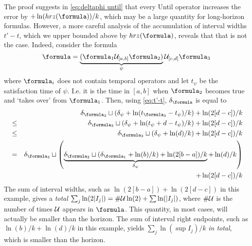 \begin{rem}
	The proof suggests in \eqref{eq:deltaphi until} that every Until operator increases the error by $+\ln(hrz(\formula))/k$, which may be a large quantity for long-horizon formulas.
	However, a more careful analysis of the accumulation of interval widths $t'-t$, which we upper bounded above by $hrz(\formula)$, reveals that that is not the case.
	Indeed, consider the formula
	\[\formula = \underbrace{(\formula_1 \until_{[a,b]} \formula_2) }_{\psi}\until_{[c,d]} \formula_3\]
	where $\formula_i$ does not contain temporal operators and let $t_\psi$ be the satisfaction time of $\psi$. 
	I.e. it is the time in $[a,b]$ when $\formula_2$ becomes true and `takes over' from $\formula_1$.
	Then, using \eqref{eq:t'-t}, $\delta_{\formula}$ is equal to
	\begin{eqnarray*}
	 && \delta_{\formula_3} \sqcup ( \delta_{\psi} + \ln(t_{\formula_3} - t_\psi)/k )+ \ln(2[d-c])/k 
	\\
	&\leq& \delta_{\formula_3} \sqcup ( \delta_{\psi} + \ln(t_\psi + d - t_\psi)/k )+ \ln(2[d-c])/k 
	\\
	&\leq& \delta_{\formula_3} \sqcup ( \delta_{\psi} + \ln(d)/k )+ \ln(2[d-c])/k 
	\\
	&=& \delta_{\formula_3} \sqcup \left( \underbrace{\delta_{\formula_2} \sqcup ( \delta_{\formula_1} + \ln(b)/k )+ \ln(2[b-a])/k }_{\delta_\psi} + \ln(d)/k \right)
	\\
	&& \quad + \ln(2[d-c])/k 
	\end{eqnarray*}
	The sum of interval widths, such as $\ln(2[b-a])+\ln(2[d-c])$ in this example, gives a \textit{total} $\sum_j\ln(2|I_j|) = \#\mathcal{U}\ln(2) +  \sum\ln(|I_j|)$, where $\#\mathcal{U}$ is the number of times $\mathcal{U}$ appears in $\formula$. 
	This quantity, in most cases, will actually be smaller than the horizon.
	The sum of interval right endpoints, such as $\ln(b)/k + \ln(d)/k$ in this example, yields $\sum_j \ln(\sup I_j)/k$ \textit{in total}, which is smaller than the horizon.
\end{rem}